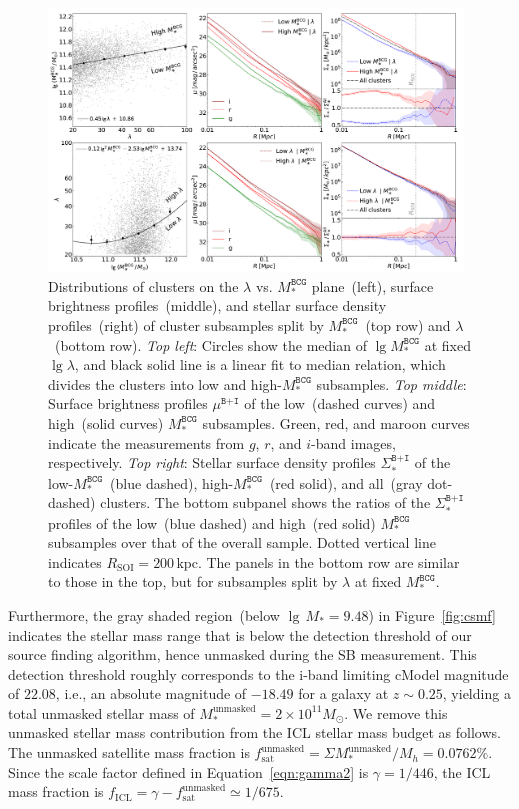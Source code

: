 \documentclass[fleqn,usenatbib]{mnras}
\newcommand{\rsoi}{R_{\mathrm{SOI}}}
\newcommand{\sigbi}{\Sigma_*^{\texttt{B+I}}}
\newcommand{\mubi}{\mu^{\texttt{B+I}}}
\newcommand{\msbcg}{M_*^{\texttt{BCG}}}
\newcommand{\kpc}{\mathrm{kpc}}
\newcommand{\msol}{M_{\odot}}
\begin{document}
\begin{figure}
    \centering\includegraphics[width=0.98\textwidth]{fig/gri_subsample_result.pdf}
    \caption{Distributions of clusters on the $\lambda$ vs. $\msbcg$
    plane~(left), surface brightness profiles~(middle), and stellar surface
    density profiles~(right) of cluster subsamples split by $\msbcg$~(top
    row) and $\lambda$~(bottom row).
	{\it Top left}: Circles show the median
    of $\lg\msbcg$ at fixed $\lg\lambda$, and black solid line is a linear
    fit to median relation, which divides the clusters into low and
    high-$\msbcg$ subsamples. {\it Top middle}: Surface brightness profiles
    $\mubi$ of the low~(dashed curves) and high~(solid curves) $\msbcg$
    subsamples. Green, red, and maroon curves indicate the measurements
    from $g$, $r$, and $i$-band images, respectively. {\it Top right}:
    Stellar surface density profiles $\sigbi$ of the low-$\msbcg$~(blue
    dashed), high-$\msbcg$~(red solid), and all~(gray dot-dashed) clusters.
    The bottom subpanel shows the ratios of the $\sigbi$ profiles of the
    low~(blue dashed) and high~(red solid) $\msbcg$ subsamples over that of
    the overall sample. Dotted vertical line indicates $\rsoi{=}200\,\kpc$.
    The panels in the bottom row are similar to those in the top, but for
    subsamples split by $\lambda$ at fixed $\msbcg$.\label{fig:split}}
\end{figure}

Furthermore, the gray shaded region~(below $\lg\,M_*{=}9.48$) in
Figure~\ref{fig:csmf} indicates the stellar mass range that is below the
detection threshold of our source finding algorithm, hence unmasked during
the SB measurement.  This detection threshold roughly corresponds to the
i-band limiting cModel magnitude of $22.08$, i.e., an absolute magnitude of
$-18.49$ for a galaxy at $z{\sim}0.25$, yielding a total unmasked stellar
mass of $M_*^{\mathrm{unmasked}}{=}2{\times}10^{11}\msol$. We remove
this unmasked stellar mass contribution from the ICL stellar mass budget as
follows.  The unmasked satellite mass fraction is
$f^{\mathrm{unmasked}}_{\mathrm{sat}}{=}\Sigma
M_*^{\mathrm{unmasked}}/M_h{=}0.0762\%$. Since the scale factor defined in
Equation~\ref{eqn:gamma2} is $\gamma{=}1/446$, the ICL mass
fraction is $f_{\mathrm{ICL}}{=}\gamma{-}f^{\mathrm{unmasked}}_{\mathrm{sat}}
{\simeq}1/675$.
\end{document}

